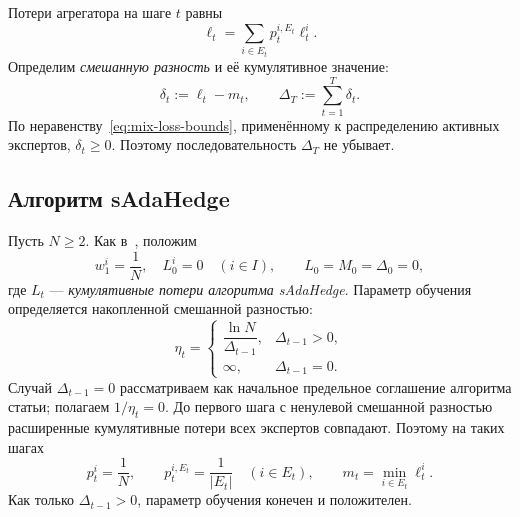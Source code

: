\documentclass[a4paper,12pt]{article}
\theoremstyle{plain}
\theoremstyle{definition}
\theoremstyle{remark}
\numberwithin{equation}{section}
\begin{document}
Потери агрегатора на шаге $t$ равны
\[
\ell_t = \sum_{i\in E_t}p_t^{i,E_t}\ell_t^i.
\]
Определим \textit{смешанную разность} и её кумулятивное значение:
\[
\delta_t := \ell_t-m_t,
\qquad
\Delta_T := \sum_{t=1}^{T}\delta_t.
\]
По неравенству~\eqref{eq:mix-loss-bounds}, применённому к распределению активных экспертов, $\delta_t\geqslant0$. Поэтому последовательность $\Delta_T$ не убывает.

\subsection{Алгоритм sAdaHedge}

Пусть $N\geqslant2$. Как в~\cite{VyuginSham}, положим
\[
w_1^i=\frac1N,\quad L_0^i=0\quad(i\in I),
\qquad L_0=M_0=\Delta_0=0,
\]
где $L_t$ — \textit{кумулятивные потери алгоритма sAdaHedge}.
Параметр обучения определяется накопленной смешанной разностью:
\begin{equation}
\label{eq:specialist-learning-rate}
\eta_t=
\begin{cases}
\dfrac{\ln N}{\Delta_{t-1}}, & \Delta_{t-1}>0,\\[6pt]
\infty, & \Delta_{t-1}=0.
\end{cases}
\end{equation}
Случай $\Delta_{t-1}=0$ рассматриваем как начальное предельное соглашение алгоритма статьи; полагаем $1/\eta_t=0$. До первого шага с ненулевой смешанной разностью расширенные кумулятивные потери всех экспертов совпадают. Поэтому на таких шагах
\[
p_t^i=\frac1N,
\qquad
p_t^{i,E_t}=\frac1{|E_t|}\quad(i\in E_t),
\qquad
m_t=\min_{i\in E_t}\ell_t^i.
\]
Как только $\Delta_{t-1}>0$, параметр обучения конечен и положителен.
\end{document}
